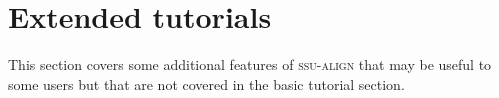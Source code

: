\section{Extended tutorials}

This section covers some additional features of \textsc{ssu-align}
that may be useful to some users but that are not covered in the basic
tutorial section. 












